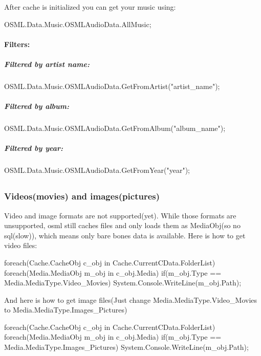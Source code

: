 After cache is initialized you can get your music using\+: \begin{DoxyVerb}OSML.Data.Music.OSMLAudioData.AllMusic;
\end{DoxyVerb}


\paragraph*{Filters\+:}

\subparagraph*{Filtered by artist name\+:}

\begin{DoxyVerb}OSML.Data.Music.OSMLAudioData.GetFromArtist("artist_name");
\end{DoxyVerb}


\subparagraph*{Filtered by album\+:}

\begin{DoxyVerb}OSML.Data.Music.OSMLAudioData.GetFromAlbum("album_name");
\end{DoxyVerb}


\subparagraph*{Filtered by year\+:}

\begin{DoxyVerb}OSML.Data.Music.OSMLAudioData.GetFromYear("year");
\end{DoxyVerb}


\subsection*{}

\subsubsection*{Videos(movies) and images(pictures)}

Video and image formats are not supported(yet). While those formats are unsupported, osml still caches files and only loads them as Media\+Obj(so no sql(slow)), which means only bare bones data is available. Here is how to get video files\+: \begin{DoxyVerb}foreach(Cache.CacheObj c_obj in Cache.CurrentCData.FolderList) {
    foreach(Media.MediaObj m_obj in c_obj.Media) {
        if(m_obj.Type == Media.MediaType.Video_Movies) {
            System.Console.WriteLine(m_obj.Path);
        }
    }
}
\end{DoxyVerb}


And here is how to get image files(Just change Media.\+Media\+Type.\+Video\+\_\+\+Movies to Media.\+Media\+Type.\+Images\+\_\+\+Pictures) \begin{DoxyVerb}foreach(Cache.CacheObj c_obj in Cache.CurrentCData.FolderList) {
    foreach(Media.MediaObj m_obj in c_obj.Media) {
        if(m_obj.Type == Media.MediaType.Images_Pictures) {
            System.Console.WriteLine(m_obj.Path);
        }
    }
}
\end{DoxyVerb}


